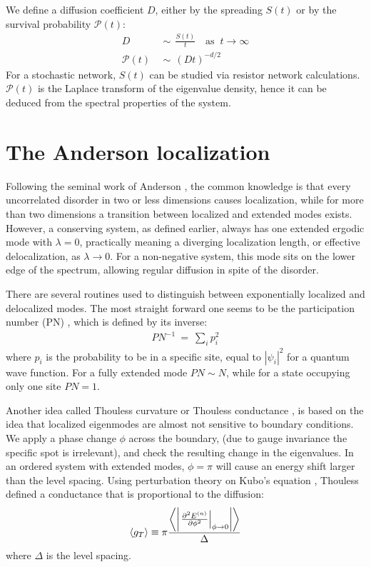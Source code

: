 We define a diffusion coefficient $D$, either by the spreading $S(t)$
or by the survival probability $\mathcal{P}(t)$:
%
\begin{align}
D\ \ &\sim\ \ \frac{S(t)}{t}  \quad \textrm{as }\ t\rightarrow\infty \\
\mathcal{P}(t)\ \ &\sim\ \ (Dt)^{-d/2}
\end{align}
%
For a stochastic network, $S(t)$ can be studied via resistor network 
calculations. $\mathcal{P}(t)$ is the Laplace transform of the 
eigenvalue density, hence it can be deduced from the spectral properties of the 
system. 
%


\section{The Anderson localization}\label{sec:anderson}


Following the seminal work of Anderson \cite{anderson_absence_1958,markos_numerical_2006},
the common knowledge is that every uncorrelated disorder in two or
less dimensions causes localization, while for more than two dimensions
a transition between localized and extended modes exists. However, a conserving
system, as defined earlier, always has one extended ergodic mode with $\lambda=0$,
practically meaning a diverging localization length,
or effective delocalization, as $\lambda\rightarrow 0$.
For a non-negative system, this mode sits on the lower edge of the spectrum, 
allowing regular diffusion in spite of the disorder.


There are several routines used to distinguish between exponentially localized and delocalized modes.
The most straight forward one seems to be the participation number (PN) 
\cite{edwards_numerical_1972}, which is defined by its inverse:
%
\begin{align}
PN^{-1} \ =\ \sum_i p_i^2
\end{align}
where $p_i$ is the probability to be in a specific site, equal to $|\psi_i|^2$ 
for a quantum wave function. For a fully extended mode $PN\sim N$, while for a state
occupying only one site $PN = 1 $.


Another idea called Thouless curvature or Thouless conductance 
\cite{edwards_numerical_1972,thouless_electrons_1974,braun_level_1997}, is based
on the idea that localized eigenmodes are almost not sensitive to boundary conditions. We apply a 
phase change $\phi$ across the boundary, (due to gauge invariance the specific spot is irrelevant),
and check the resulting change in the eigenvalues. 
In an ordered system with extended modes, $\phi=\pi$ will cause an energy
shift larger than the level spacing. 
Using perturbation theory on Kubo's equation \cite{kubo_statistical-mechanical_1957},
Thouless defined a conductance that is proportional to the diffusion: 
\begin{align}\label{eq:thouless}
\left\langle g_T\right\rangle  \equiv \pi \frac{\left\langle \left|\left. \frac{\partial ^2 E^{(n)}}{\partial \phi^2}\right|_{\phi\rightarrow 0}\right|\right\rangle}{\Delta}
\end{align}
where $\Delta$ is the level spacing.




